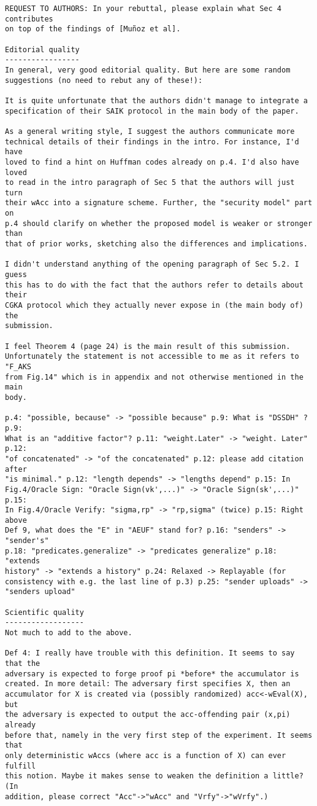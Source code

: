 \documentclass[letterpaper,10pt]{article}
\begin{document}
\begin{enumerate}[label=(\Alph*)]
\begin{verbatim}
REQUEST TO AUTHORS: In your rebuttal, please explain what Sec 4 contributes
on top of the findings of [Muñoz et al].

Editorial quality
-----------------
In general, very good editorial quality. But here are some random
suggestions (no need to rebut any of these!):

It is quite unfortunate that the authors didn't manage to integrate a
specification of their SAIK protocol in the main body of the paper.

As a general writing style, I suggest the authors communicate more
technical details of their findings in the intro. For instance, I'd have
loved to find a hint on Huffman codes already on p.4. I'd also have loved
to read in the intro paragraph of Sec 5 that the authors will just turn
their wAcc into a signature scheme. Further, the "security model" part on
p.4 should clarify on whether the proposed model is weaker or stronger than
that of prior works, sketching also the differences and implications.

I didn't understand anything of the opening paragraph of Sec 5.2. I guess
this has to do with the fact that the authors refer to details about their
CGKA protocol which they actually never expose in (the main body of) the
submission.

I feel Theorem 4 (page 24) is the main result of this submission.
Unfortunately the statement is not accessible to me as it refers to "F_AKS
from Fig.14" which is in appendix and not otherwise mentioned in the main
body.

p.4: "possible, because" -> "possible because" p.9: What is "DSSDH" ? p.9:
What is an "additive factor"? p.11: "weight.Later" -> "weight. Later" p.12:
"of concatenated" -> "of the concatenated" p.12: please add citation after
"is minimal." p.12: "length depends" -> "lengths depend" p.15: In
Fig.4/Oracle Sign: "Oracle Sign(vk',...)" -> "Oracle Sign(sk',...)" p.15:
In Fig.4/Oracle Verify: "sigma,rp" -> "rp,sigma" (twice) p.15: Right above
Def 9, what does the "E" in "AEUF" stand for? p.16: "senders" -> "sender's"
p.18: "predicates.generalize" -> "predicates generalize" p.18: "extends
history" -> "extends a history" p.24: Relaxed -> Replayable (for
consistency with e.g. the last line of p.3) p.25: "sender uploads" ->
"senders upload"

Scientific quality
------------------
Not much to add to the above.

Def 4: I really have trouble with this definition. It seems to say that the
adversary is expected to forge proof pi *before* the accumulator is
created. In more detail: The adversary first specifies X, then an
accumulator for X is created via (possibly randomized) acc<-wEval(X), but
the adversary is expected to output the acc-offending pair (x,pi) already
before that, namely in the very first step of the experiment. It seems that
only deterministic wAccs (where acc is a function of X) can ever fulfill
this notion. Maybe it makes sense to weaken the definition a little? (In
addition, please correct "Acc"->"wAcc" and "Vrfy"->"wVrfy".)



\end{verbatim}
\end{enumerate}
\end{document}
